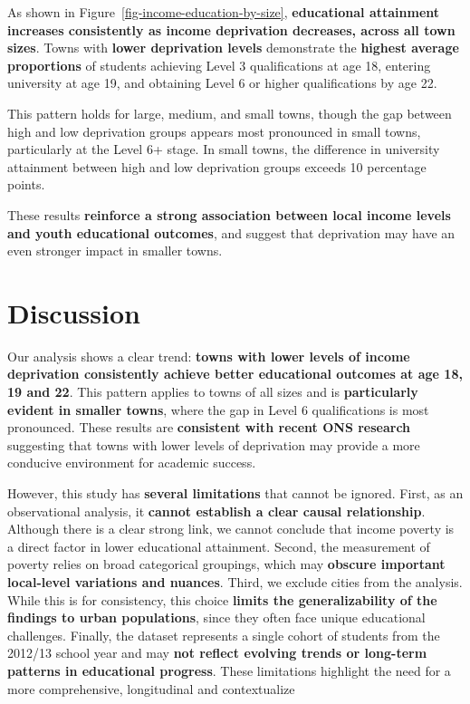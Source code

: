 \documentclass[11pt,en]{../tex/elegantpaper}
\begin{document}
As shown in Figure~\ref{fig-income-education-by-size},
\textbf{educational attainment increases consistently as income
deprivation decreases, across all town sizes}. Towns with \textbf{lower
deprivation levels} demonstrate the \textbf{highest average proportions}
of students achieving Level 3 qualifications at age 18, entering
university at age 19, and obtaining Level 6 or higher qualifications by
age 22.

This pattern holds for large, medium, and small towns, though the gap
between high and low deprivation groups appears most pronounced in small
towns, particularly at the Level 6+ stage. In small towns, the
difference in university attainment between high and low deprivation
groups exceeds 10 percentage points.

These results \textbf{reinforce a strong association between local
income levels and youth educational outcomes}, and suggest that
deprivation may have an even stronger impact in smaller towns.

\section{Discussion}\label{discussion}

Our analysis shows a clear trend: \textbf{towns with lower levels of
income deprivation consistently achieve better educational outcomes at
age 18, 19 and 22}. This pattern applies to towns of all sizes and is
\textbf{particularly evident in smaller towns}, where the gap in Level 6
qualifications is most pronounced. These results are \textbf{consistent
with recent ONS research} suggesting that towns with lower levels of
deprivation may provide a more conducive environment for academic
success.

However, this study has \textbf{several limitations} that cannot be
ignored. First, as an observational analysis, it \textbf{cannot
establish a clear causal relationship}. Although there is a clear strong
link, we cannot conclude that income poverty is a direct factor in lower
educational attainment. Second, the measurement of poverty relies on
broad categorical groupings, which may \textbf{obscure important
local-level variations and nuances}. Third, we exclude cities from the
analysis. While this is for consistency, this choice \textbf{limits the
generalizability of the findings to urban populations}, since they often
face unique educational challenges. Finally, the dataset represents a
single cohort of students from the 2012/13 school year and may
\textbf{not reflect evolving trends or long-term patterns in educational
progress}. These limitations highlight the need for a more
comprehensive, longitudinal and contextualize
\end{document}
